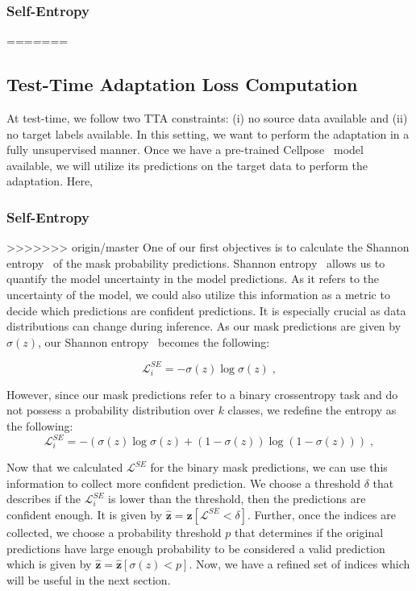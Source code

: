 \subsubsection{Self-Entropy}
=======
\subsection{Test-Time Adaptation Loss Computation}

At test-time, we follow two TTA constraints: (i) no source data available and (ii) no target labels available. In this setting, we want to perform the adaptation in a fully unsupervised manner. Once we have a pre-trained Cellpose~\cite{stringer2021cellpose} model available, we will utilize its predictions on the target data to perform the adaptation. Here,   

\subsubsection{Self-Entropy}\label{sec:tta-se}
>>>>>>> origin/master
One of our first objectives is to calculate the Shannon entropy~\cite{shannon1948mathematical} of the mask probability predictions. Shannon entropy~\cite{shannon1948mathematical} allows us to quantify the model uncertainty in the model predictions. As it refers to the uncertainty of the model, we could also utilize this information as a metric to decide which predictions are confident predictions. It is especially crucial as data distributions can change during inference. As our mask predictions are given by $\sigma(z)$, our Shannon entropy~\cite{shannon1948mathematical} becomes the following:

\begin{equation}
    \mathcal{L}_i^{SE} = -\sigma(z) \log \sigma(z) \; ,
\end{equation}

However, since our mask predictions refer to a binary crossentropy task and do not possess a probability distribution over $k$ classes, we redefine the entropy as the following:
\begin{equation}
    \mathcal{L}_i^{SE} = -(\sigma(z) \log \sigma(z) + (1-\sigma(z)) \log (1-\sigma(z))) \; ,
\end{equation}

Now that we calculated $\mathcal{L}^{SE}$ for the binary mask predictions, we can use this information to collect more confident prediction. We choose a threshold $\delta$ that describes if the $\mathcal{L}_i^{SE}$ is lower than the threshold, then the predictions are confident enough. It is given by $\hat{\bm{z}} = \bm{z}[\mathcal{L}^{SE}<\delta]$. Further, once the indices are collected, we choose a probability threshold $p$ that determines if the original predictions have large enough probability to be considered a valid prediction which is given by $\hat{\bm{z}} = \hat{\bm{z}}[\sigma(z)<p]$. Now, we have a refined set of indices which will be useful in the next section. 

